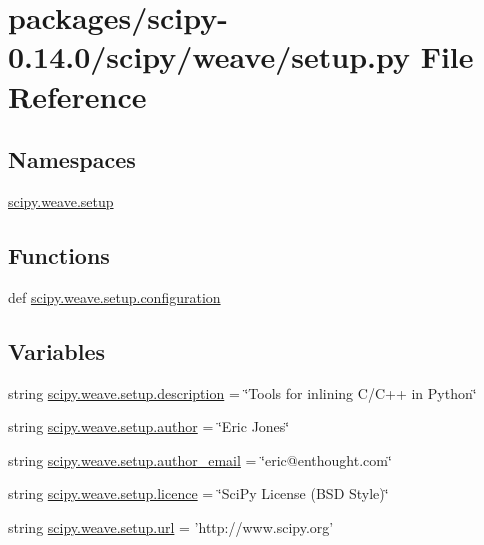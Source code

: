 \hypertarget{packages_2scipy-0_814_80_2scipy_2weave_2setup_8py}{}\section{packages/scipy-\/0.14.0/scipy/weave/setup.py File Reference}
\label{packages_2scipy-0_814_80_2scipy_2weave_2setup_8py}
\subsection*{Namespaces}
\begin{DoxyCompactItemize}
\item 
 \hyperlink{namespacescipy_1_1weave_1_1setup}{scipy.\+weave.\+setup}
\end{DoxyCompactItemize}
\subsection*{Functions}
\begin{DoxyCompactItemize}
\item 
def \hyperlink{namespacescipy_1_1weave_1_1setup_a8965895ff39a9f8613b9e46128e30e2f}{scipy.\+weave.\+setup.\+configuration}
\end{DoxyCompactItemize}
\subsection*{Variables}
\begin{DoxyCompactItemize}
\item 
string \hyperlink{namespacescipy_1_1weave_1_1setup_a6a57337ab5b06191aa66e10c2a2cfc7f}{scipy.\+weave.\+setup.\+description} = \char`\"{}Tools for inlining C/C++ in Python\char`\"{}
\item 
string \hyperlink{namespacescipy_1_1weave_1_1setup_a8beac4f816486fbd7b744d51c6294339}{scipy.\+weave.\+setup.\+author} = \char`\"{}Eric Jones\char`\"{}
\item 
string \hyperlink{namespacescipy_1_1weave_1_1setup_a313bcae18b6012b2324ba64d9805c3f9}{scipy.\+weave.\+setup.\+author\+\_\+email} = \char`\"{}eric@enthought.\+com\char`\"{}
\item 
string \hyperlink{namespacescipy_1_1weave_1_1setup_af8045dd0e347324719122648b6f9159c}{scipy.\+weave.\+setup.\+licence} = \char`\"{}Sci\+Py License (B\+S\+D Style)\char`\"{}
\item 
string \hyperlink{namespacescipy_1_1weave_1_1setup_a0a62c1c29ffcb7096efeb467a10e573d}{scipy.\+weave.\+setup.\+url} = 'http\+://www.\+scipy.\+org'
\end{DoxyCompactItemize}
